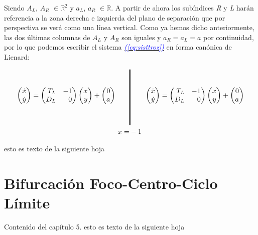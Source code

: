 \documentclass[12pt,a4paper]{report} %
\newcommand{\eref}[1]{\hyperref[#1]{\textcolor{blue}{\textit{(\ref*{#1})}}}}
\begin{document}
    Siendo $A_L$, $A_R$ $\in \mathbb{R}^2$ y $a_L$, $a_R$ $\in \mathbb{R}$. A partir de ahora los subíndices \textit{R} y \textit{L} harán referencia a la zona derecha e izquierda del plano de separación que por perspectiva se verá como una línea vertical. Como ya hemos dicho anteriormente, las dos últimas columnas de $A_L$ y $A_R$ son iguales y $a_R=a_L=a$ por continuidad, por lo que podemos escribir el sistema \eref{eq:sisttroz} en forma canónica de Lienard:
    
        \begin{equation}
    	\label{eq:sisttrozlie}
    	\begin{aligned}
    		\begin{pmatrix*}[r]
    			\dot{x}\\ \dot{y}
    		\end{pmatrix*}= \begin{pmatrix*}[r]
    		T_L & -1 \\ D_L & 0
    		\end{pmatrix*} \begin{pmatrix*}[r]
    			x \\ y
    		\end{pmatrix*}+\begin{pmatrix*}[r]
    		0 \\ a
    		\end{pmatrix*} \qquad 
    		&\rule[-40pt]{1.5pt}{80pt} \qquad 
    		\begin{pmatrix*}[r]
    			\dot{x}\\ \dot{y}
    		\end{pmatrix*}= \begin{pmatrix*}[r]
    		T_L & -1 \\ D_L & 0
    		\end{pmatrix*} \begin{pmatrix*}[r]
    			x \\ y
    		\end{pmatrix*}+\begin{pmatrix*}[r]
    		0 \\ a
    		\end{pmatrix*} \\ x=&-1
    	\end{aligned}
    \end{equation}\smallskip

	
	\newpage
	esto es texto de la siguiente hoja
	
	\chapter{Bifurcación Foco-Centro-Ciclo Límite}
	Contenido del capítulo 5.
	\newpage
	esto es texto de la siguiente hoja
	
\end{document}
